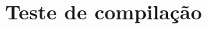 \documentclass[journal,onecolumn]{IEEEtran}
\begin{document}
\title{Teste de compilação}
\maketitle


\end{document}

